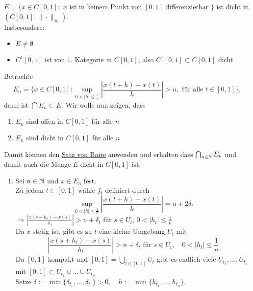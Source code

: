 \begin{satz}
	$E = \{ x \in C[0, 1]:$ $x$ ist in keinem Punkt von $[0, 1]$ differenzierbar $\}$ ist dicht in $(C[0, 1], \| \cdot \|_{\infty})$. \\
	Insbesondere:
 		\begin{itemize}
			\item $E \neq \emptyset$
			\item $C^{1}[0, 1]$ ist von 1. Kategorie in $C[0, 1]$, also $C^{1}[0, 1] \subset C[0, 1]$ dicht
		\end{itemize}
\end{satz}

\begin{beweis}
	Betrachte 
	\[ E_{n} = \{ x \in C[0, 1]: \sup_{0 < |h| \leq \frac{1}{n}} \left| \frac{x(t + h) - x(t)}{h} \right| > n, \text{ für alle } t \in [0, 1] \}, \]
	dann ist $\bigcap E_{n} \subset E$. Wir wolle nun zeigen, dass 
	\begin{enumerate}[label=\roman*\upshape)]
		\item $E_{n}$ sind offen in $C[0, 1]$ für alle $n$
		\item $E_{n}$ sind dicht in $C[0, 1]$ für alle $n$
	\end{enumerate}
	Damit können den \hyperref[satz:9.1-baire]{Satz von Baire} anwenden und erhalten dass $\bigcap_{n \in \mathbb{N}} E_{n}$ und damit auch die Menge $E$ dicht in $C[0, 1]$ ist. \\
	\begin{enumerate}[label=\roman*\upshape)]
		\item Sei $n \in \mathbb{N}$ und $x \in E_{n}$ fest. \\
			Zu jedem $t \in [0, 1]$ wähle $f_{t}$ definiert durch
			\[ \sup_{0 < |h| \leq \frac{1}{n}} \left| \frac{x(t + h) - x(t)}{h} \right| = n + 2 \delta_{t} \]
			$\Rightarrow \left| \frac{x(s + h_{t}) - x(s)}{h_{t}} \right| > n + \delta_{t}$ für $s \in U_{t}$, $0 < |h_{t}| \leq \frac{1}{n} $ \\
			Da $x$ stetig ist, gibt es zu $t$ eine kleine Umgebung $U_{t}$ mit
			\[ \left| \frac{x(s + h_{t}) - x(s)}{h_{t}} \right| > n + \delta_{t} \text{ für } s \in U_{t}, \quad 0 < |h_{t}| \leq \frac{1}{n} \]
			Da $[0, 1]$ kompakt und $[0, 1] = \bigcup_{t \in [0, 1]} U_{t}$ gibt es endlich viele $U_{t_{1}}, \dotsc, U_{t_{n}}$ mit $[0, 1] \subset U_{t_{1}} \cup \dotsc \cup U_{t_{n}}$ \\
			Setze $\delta := \min \{ \delta_{t_{1}}, \dotsc, \delta_{t_{1}} \} > 0, \quad h := \min \{ h_{t_{1}}, \dotsc, h_{t_{n}} \}$. \\

\end{enumerate}
\end{beweis}
